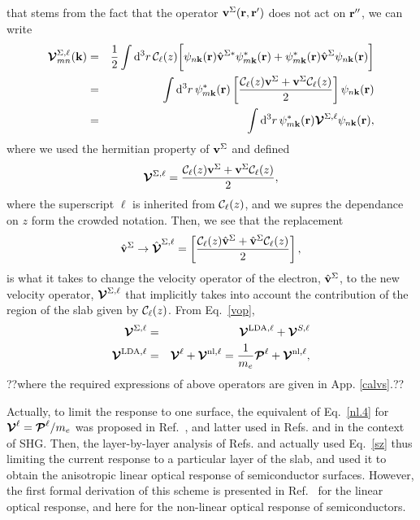 \documentclass{article}
\begin{document}
that stems from the fact that the operator $\mathbf{v}^\Sigma(\mathbf{r},\mathbf{r}')$ does not act on
$\mathbf{r}''$, we can write
\begin{eqnarray}\label{nl.3}
\boldsymbol{\mathcal{\cal V}}^{\Sigma,\ell}_{mn}({\mathbf k})
&=&
\frac{1}{2}
\int \mathrm{d}^3 r\,
 {\mathbf{\cal C}}_\ell(z)
 \bigg[
\psi_{n\mathbf{k}}(\mathbf{r})
\hat{\mathbf{v}}^{\Sigma *}\psi^*_{m\mathbf{k}}(\mathbf{r})
+ 
\psi^*_{m\mathbf{k}}(\mathbf{r})\hat{\mathbf{v}}^\Sigma
\psi_{n\mathbf{k}}(\mathbf{r})
\bigg]
\nonumber\\
&=&
\int \mathrm{d}^3 r\,
\psi^*_{m\mathbf{k}}(\mathbf{r})
\left[\frac{{\mathbf{\cal C}}_\ell(z) \mathbf{v}^\Sigma +
\mathbf{v}^\Sigma {\mathbf{\cal C}}_\ell(z)}{2}\right]
\psi_{n\mathbf{k}}(\mathbf{r})
\nonumber\\
&=&
\int \mathrm{d}^3 r\,
\psi^*_{m\mathbf{k}}(\mathbf{r})
\boldsymbol{\mathcal{\cal V}}^{\Sigma,\ell}
\psi_{n\mathbf{k}}(\mathbf{r})
,
\end{eqnarray}
where we used the hermitian property of $\mathbf{v}^\Sigma$ and  defined
\begin{eqnarray}\label{nl.4}
\boldsymbol{\mathcal{\cal V}}^{\Sigma,\ell}
=
\frac{{\mathbf{\cal C}}_\ell(z) \mathbf{v}^\Sigma +
\mathbf{v}^\Sigma {\mathbf{\cal C}}_\ell(z)}{2}
,
\end{eqnarray} 
where the superscript $\ell$ is inherited from ${\mathbf{\cal C}}_\ell(z)$, and we
supres the dependance on $z$ form the crowded notation.  
Then,
we see that the replacement
\begin{equation}\label{vcali}
\hat{\mathbf{v}}^\Sigma \to \hat{\boldsymbol{\mathcal{\cal V}}}^{\Sigma,\ell}=\left[\frac{{\mathbf{\cal C}}_\ell(z) \hat{\mathbf{v}}^\Sigma +
\hat{\mathbf{v}}^\Sigma {\mathbf{\cal C}}_\ell(z)}{2}\right],
\end{equation} 
is what it takes to change the
velocity operator of the electron, $\hat{\mathbf{v}}^\Sigma$, to the new velocity
operator, $\boldsymbol{\mathcal{\cal V}}^{\Sigma,\ell}$
 that implicitly takes into account the
contribution of the region of the slab given by ${\mathbf{\cal C}}_\ell(z)$.
From Eq.~\eqref{vop},
\begin{eqnarray}\label{vopii}
\boldsymbol{\mathcal{\cal V}}^{\Sigma,\ell}
&=&
\boldsymbol{\mathcal{\cal V}}^{\mathrm{LDA},\ell}
+
\boldsymbol{\mathcal{\cal V}}^{S,\ell}
\nonumber\\
\boldsymbol{\mathcal{\cal V}}^{\mathrm{LDA},\ell}
&=&
\boldsymbol{\mathcal{\cal V}}^{\ell}
+
\boldsymbol{\mathcal{\cal V}}^{\mathrm{nl},\ell}
=
\frac{1}{m_e}
\boldsymbol{\mathcal{\cal P}}^{\ell}
+
\boldsymbol{\mathcal{\cal V}}^{\mathrm{nl},\ell}
,
\end{eqnarray}
??where the required expressions of above operators
are given in 
App. \ref{calvs}.??

Actually, 
to limit the response to one surface, 
the equivalent of Eq.~\eqref{nl.4} for $\boldsymbol{\mathcal{\cal V}}^\ell=\boldsymbol{\mathcal{\cal P}}^\ell/m_e$
 was proposed 
in Ref.~\cite{reining_microscopic_1994}, and latter used in Refs.
\cite{mendoza_ab_2001} 
and \cite{mejia_layer-by-layer_2004} in the context of SHG. Then, 
the layer-by-layer analysis of Refs. \cite{hogan_optical_2003} 
and \cite{castillo_layer-by-layer_2003}
actually used Eq.~\eqref{sz}
thus limiting the current response
to a particular layer of the slab, and used it to obtain the
anisotropic linear optical response of semiconductor surfaces.
However, the first formal derivation of this scheme is presented in
Ref.~\cite{mendoza_layer-by-layer_2006} for the linear optical response, and
here for the non-linear optical response of semiconductors.
\end{document}
